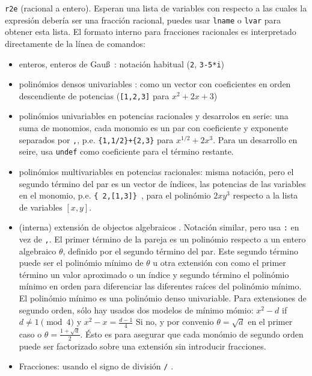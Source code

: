 \documentclass{article}
\begin{document}
\begin{enumerate}
{\tt r2e} (racional a entero). Esperan una lista de variables con respecto a las cuales la expresi\'on deber\'ia ser una fracci\'on racional, puedes usar {\tt lname} o {\tt lvar} para obtener esta lista. El formato interno para fracciones racionales es interpretado directamente de la l\'inea de comandos:
\begin{itemize}
\item enteros, enteros de Gau\ss\ : notaci\'on habitual ({\tt 2}, {\tt 3-5*i})  
\item polin\'omios densos univariables : como un vector con coeficientes
en orden descendiente de potencias ({\tt [1,2,3]} para $x^2+2x+3$) 
\item polin\'omios univariables en potencias racionales y desarrolos en serie: una suma de
monomios, cada monomio es un par con coeficiente y exponente separados
por {\tt ,}, p.e. {\tt \{1,1/2\}+\{2,3\}} para $x^{1/2}+2x^3$. Para
un desarrollo en seire, usa {\tt undef} como coeficiente para el t\'ermino restante.
\item polin\'omios multivariables en potencias racionales: misma notaci\'on, pero el segundo t\'ermino del par es un vector de \'indices, las potencias de las variables
en el monomio, p.e. {\tt \{ 2,[1,3]\} }, para el polin\'omio
$2xy^3$ respecto a la lista de variables $[x,y]$.
\item (interna) extensi\'on de objectos algebraicos . Notaci\'on similar, pero 
usa {\tt :} en vez de {\tt ,}. El primer t\'ermino de la pareja es un 
polin\'omio respecto a un entero algebraico $\theta$, definido por el segundo t\'ermino del par. Este segundo t\'ermino puede ser el polin\'omio m\'inimo de $\theta$ u otra extensi\'on con como el primer t\'ermino un valor aproximado o un \'indice y segundo t\'ermino el polin\'omio m\'inimo en orden para diferenciar las diferentes ra\'ices del polin\'omio m\'inimo. El polin\'omio m\'inimo es una polin\'omio denso univariable.
Para extensiones de segundo orden, s\'olo hay usados dos modelos de m\'inimo m\'omio: $x^2-d$ if $d \neq 1 \pmod 4$ y $x^2-x=\frac{d-1}{4}$
Si no, y por convenio $\theta=\sqrt{d}$ en el primer caso
o $\theta=\frac{1+\sqrt{d}}{2}$. \'Esto es para asegurar que cada mon\'omio de segundo orden puede ser factorizado sobre una extensi\'on sin introducir fracciones.
\item Fracciones: usando el signo de divisi\'on {\tt /} .
\end{itemize}
\end{enumerate}
\end{document}
